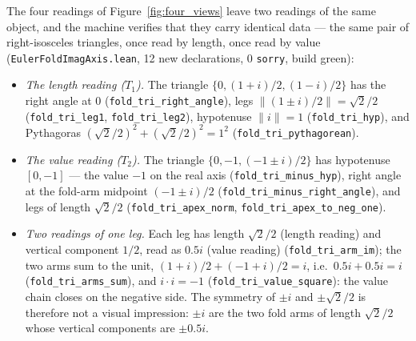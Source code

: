 \documentclass{article}
\begin{document}
The four readings of Figure~\ref{fig:four_views} leave two readings of
the same object, and the machine verifies that they carry identical
data --- the same pair of right-isosceles triangles, once read by
length, once read by value (\texttt{EulerFoldImagAxis.lean}, 12 new
declarations, 0 \texttt{sorry}, build green):
\begin{itemize}
\item \emph{The length reading ($T_1$).} The triangle
  $\{0,(1+i)/2,(1-i)/2\}$ has the right angle at $0$
  (\texttt{fold\_tri\_right\_angle}), legs
  $\|(1\pm i)/2\|=\sqrt2/2$ (\texttt{fold\_tri\_leg1},
  \texttt{fold\_tri\_leg2}), hypotenuse $\|i\|=1$
  (\texttt{fold\_tri\_hyp}), and Pythagoras
  $(\sqrt2/2)^2+(\sqrt2/2)^2=1^2$
  (\texttt{fold\_tri\_pythagorean}).
\item \emph{The value reading ($T_2$).} The triangle
  $\{0,-1,(-1\pm i)/2\}$ has hypotenuse $[0,-1]$ --- the value $-1$
  on the real axis (\texttt{fold\_tri\_minus\_hyp}), right angle at
  the fold-arm midpoint $(-1\pm i)/2$
  (\texttt{fold\_tri\_minus\_right\_angle}), and legs of length
  $\sqrt2/2$ (\texttt{fold\_tri\_apex\_norm},
  \texttt{fold\_tri\_apex\_to\_neg\_one}).
\item \emph{Two readings of one leg.} Each leg has length
  $\sqrt2/2$ (length reading) and vertical component $1/2$, read as
  $0.5i$ (value reading) (\texttt{fold\_tri\_arm\_im}); the two arms
  sum to the unit, $(1+i)/2+(-1+i)/2=i$, i.e.\ $0.5i+0.5i=i$
  (\texttt{fold\_tri\_arms\_sum}), and $i\cdot i=-1$
  (\texttt{fold\_tri\_value\_square}): the value chain closes on the
  negative side. The symmetry of $\pm i$ and $\pm\sqrt2/2$ is
  therefore not a visual impression: $\pm i$ are the two fold arms
  of length $\sqrt2/2$ whose vertical components are $\pm 0.5i$.
\end{itemize}
\end{document}
